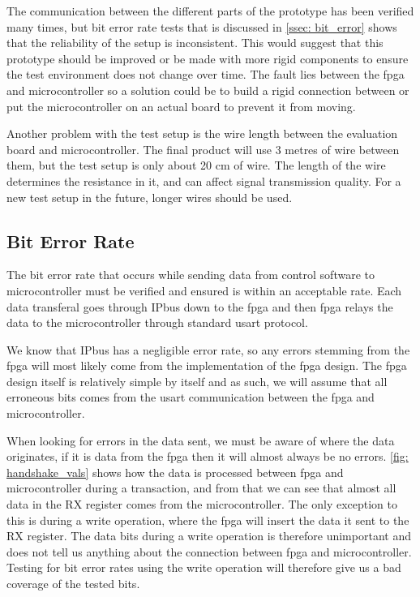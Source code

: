 \documentclass[main.tex]{subfiles}
\begin{document}
The communication between the different parts of the prototype has been verified many times, but bit error rate tests that is discussed in \autoref{ssec: bit_error} shows that the reliability of the setup is inconsistent. This would suggest that this prototype should be improved or be made with more rigid components to ensure the test environment does not change over time. The fault lies between the \gls{fpga} and microcontroller so a solution could be to build a rigid connection between or put the microcontroller on an actual board to prevent it from moving.

Another problem with the test setup is the wire length between the evaluation board and microcontroller. The final product will use 3 metres of wire between them, but the test setup is only about 20 cm of wire. The length of the wire determines the resistance in it, and can affect signal transmission quality. For a new test setup in the future, longer wires should be used.



\subsection{Bit Error Rate}
\label{ssec: bit_error}
The bit error rate that occurs while sending data from control software to microcontroller must be verified and ensured is within an acceptable rate. Each data transferal goes through IPbus down to the \gls{fpga} and then \gls{fpga} relays the data to the microcontroller through standard \gls{usart} protocol.

We know that IPbus has a negligible error rate\cite{IPbus}, so any errors stemming from the \gls{fpga} will most likely come from the implementation of the \gls{fpga} design. The \gls{fpga} design itself is relatively simple by itself and as such, we will assume that all erroneous bits comes from the \gls{usart} communication between the \gls{fpga} and microcontroller.

When looking for errors in the data sent, we must be aware of where the data originates, if it is data from the \gls{fpga} then it will almost always be no errors. \autoref{fig: handshake_vals} shows how the data is processed between \gls{fpga} and microcontroller during a transaction, and from that we can see that almost all data in the RX register comes from the microcontroller. The only exception to this is during a write operation, where the \gls{fpga} will insert the data it sent to the RX register. The data bits during a write operation is therefore unimportant and does not tell us anything about the connection between \gls{fpga} and microcontroller. Testing for bit error rates using the write operation will therefore give us a bad coverage of the tested bits.
\end{document}
